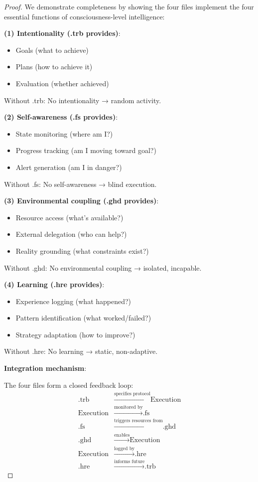 \begin{proof}
We demonstrate completeness by showing the four files implement the four essential functions of consciousness-level intelligence:

\textbf{(1) Intentionality (.trb provides)}:
\begin{itemize}
\item Goals (what to achieve)
\item Plans (how to achieve it)
\item Evaluation (whether achieved)
\end{itemize}

Without .trb: No intentionality → random activity.

\textbf{(2) Self-awareness (.fs provides)}:
\begin{itemize}
\item State monitoring (where am I?)
\item Progress tracking (am I moving toward goal?)
\item Alert generation (am I in danger?)
\end{itemize}

Without .fs: No self-awareness → blind execution.

\textbf{(3) Environmental coupling (.ghd provides)}:
\begin{itemize}
\item Resource access (what's available?)
\item External delegation (who can help?)
\item Reality grounding (what constraints exist?)
\end{itemize}

Without .ghd: No environmental coupling → isolated, incapable.

\textbf{(4) Learning (.hre provides)}:
\begin{itemize}
\item Experience logging (what happened?)
\item Pattern identification (what worked/failed?)
\item Strategy adaptation (how to improve?)
\end{itemize}

Without .hre: No learning → static, non-adaptive.

\textbf{Integration mechanism}:

The four files form a closed feedback loop:
\begin{align}
\text{.trb} &\xrightarrow{\text{specifies protocol}} \text{Execution} \\
\text{Execution} &\xrightarrow{\text{monitored by}} \text{.fs} \\
\text{.fs} &\xrightarrow{\text{triggers resources from}} \text{.ghd} \\
\text{.ghd} &\xrightarrow{\text{enables}} \text{Execution} \\
\text{Execution} &\xrightarrow{\text{logged by}} \text{.hre} \\
\text{.hre} &\xrightarrow{\text{informs future}} \text{.trb}
\end{align}


\end{proof}
